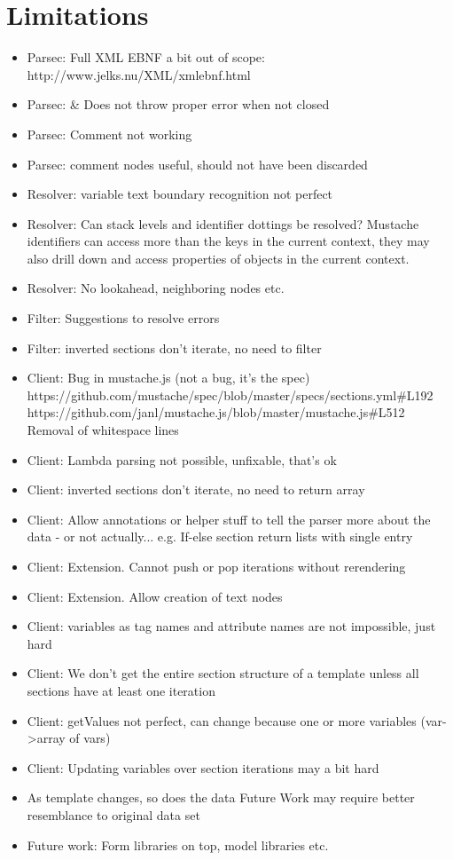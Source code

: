 \documentclass[thesis.tex]{subfiles}
\begin{document}
\section{Limitations}
\begin{itemize}
	\item Parsec: Full XML EBNF a bit out of scope: http://www.jelks.nu/XML/xmlebnf.html
	\item Parsec: \& Does not throw proper error when not closed
	\item Parsec: Comment not working
	\item Parsec: comment nodes useful, should not have been discarded
	\item Resolver: variable text boundary recognition not perfect
	\item Resolver: Can stack levels and identifier dottings be resolved?
	      Mustache identifiers can access more than the keys in the current context,
	      they may also drill down and access properties of objects in the current
	      context.
	\item Resolver: No lookahead, neighboring nodes etc.
	\item Filter: Suggestions to resolve errors
	\item Filter: inverted sections don't iterate, no need to filter
	\item Client: Bug in mustache.js (not a bug, it's the spec)
	      https://github.com/mustache/spec/blob/master/specs/sections.yml\#L192
	      https://github.com/janl/mustache.js/blob/master/mustache.js\#L512
	      Removal of whitespace lines
	\item Client: Lambda parsing not possible, unfixable, that's ok
	\item Client: inverted sections don't iterate, no need to return array
	\item Client: Allow annotations or helper stuff to tell the parser more about the data - or not actually...
	      e.g. If-else section return lists with single entry
	\item Client: Extension. Cannot push or pop iterations without rerendering
	\item Client: Extension. Allow creation of text nodes
	\item Client: variables as tag names and attribute names are not impossible, just hard
	\item Client: We don't get the entire section structure of a template unless all
	      sections have at least one iteration
	\item Client: getValues not perfect, can change because one or more variables (var->array of vars)
	\item Client: Updating variables over section iterations may a bit hard
	\item As template changes, so does the data
	      Future Work may require better resemblance to original data set
	\item Future work: Form libraries on top, model libraries etc.
\end{itemize}
\end{document}
